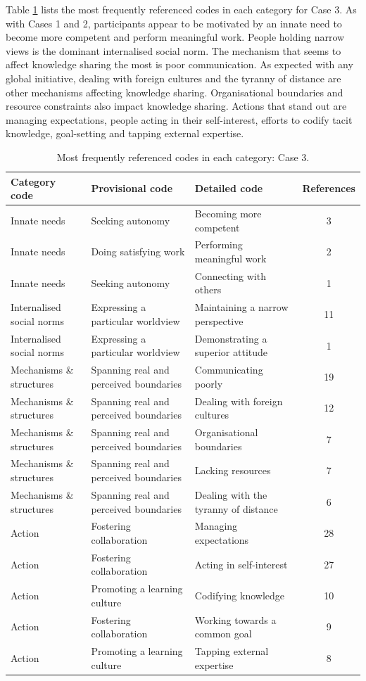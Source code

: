 Table \ref{tab:case_3_codes} lists the most frequently referenced codes in each category for Case 3. As with Cases 1 and 2, participants appear to be motivated by an innate need to become more competent and perform meaningful work. People holding narrow views is the dominant internalised social norm. The mechanism that seems to affect knowledge sharing the most is poor communication. As expected with any global initiative, dealing with foreign cultures and the tyranny of distance are other mechanisms affecting knowledge sharing. Organisational boundaries and resource constraints also impact knowledge sharing. Actions that stand out are managing expectations, people acting in their self-interest, efforts to codify tacit knowledge, goal-setting and tapping external expertise.

\begin{table}
\centering
\caption{Most frequently referenced codes in each category: Case 3.}
\label{tab:case_3_codes}
\begin{tabular}{lllc}
\toprule
Category code & Provisional code & Detailed code & References \\ 
\midrule
Innate needs & Seeking autonomy & Becoming more competent &   3 \\ 
Innate needs & Doing satisfying work & Performing meaningful work &   2 \\ 
Innate needs & Seeking autonomy & Connecting with others &   1 \\ 
Internalised social norms & Expressing a particular worldview & Maintaining a narrow perspective &  11 \\ 
Internalised social norms & Expressing a particular worldview & Demonstrating a superior attitude &   1 \\ 
Mechanisms \& structures & Spanning real and perceived boundaries & Communicating poorly &  19 \\ 
Mechanisms \& structures & Spanning real and perceived boundaries & Dealing with foreign cultures &  12 \\ 
Mechanisms \& structures & Spanning real and perceived boundaries & Organisational boundaries &   7 \\ 
Mechanisms \& structures & Spanning real and perceived boundaries & Lacking resources &   7 \\ 
Mechanisms \& structures & Spanning real and perceived boundaries & Dealing with the tyranny of distance &   6 \\ 
Action & Fostering collaboration & Managing expectations &  28 \\ 
Action & Fostering collaboration & Acting in self-interest &  27 \\ 
Action & Promoting a learning culture & Codifying knowledge &  10 \\ 
Action & Fostering collaboration & Working towards a common goal &   9 \\ 
Action & Promoting a learning culture & Tapping external expertise &   8 \\ 
\bottomrule
\end{tabular}
\end{table}

